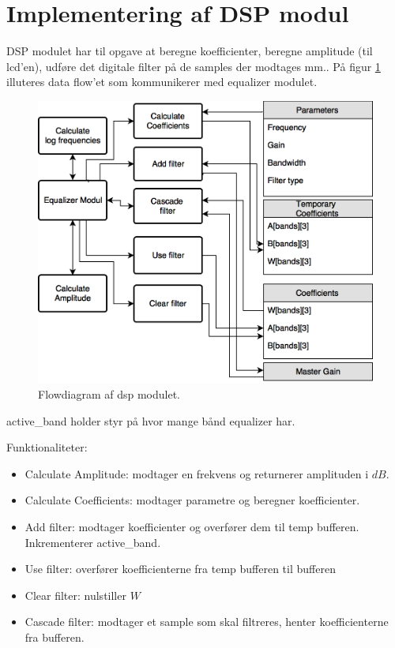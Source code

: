 \section{Implementering af DSP modul}\label{sec:implementering_dsp}
DSP modulet har til opgave at beregne koefficienter, beregne amplitude (til lcd'en), udføre det 
digitale filter på de samples der modtages mm.. På figur \ref{fig:dsp_flow_diag} illuteres data flow'et 
som kommunikerer med equalizer modulet.

\begin{figure}[h]
\centering
\includegraphics[scale = 0.3]{billeder/dsp_flowdiagram}
\caption{Flowdiagram af dsp modulet.}
\label{fig:dsp_flow_diag}
\end{figure}


active\_band holder styr på hvor mange bånd equalizer har.



Funktionaliteter:
\begin{itemize}[noitemsep,nolistsep]
\item Calculate Amplitude: modtager en frekvens og returnerer amplituden i $dB$.  \\
\item Calculate Coefficients: modtager parametre og beregner koefficienter. \\
\item Add filter: modtager koefficienter og overfører dem til temp bufferen. Inkrementerer active\_band.\\
\item Use filter: overfører koefficienterne fra temp bufferen til bufferen \\
\item Clear filter: nulstiller $W$  \\
\item Cascade filter: modtager et sample som skal filtreres, henter koefficienterne fra bufferen.
\end{itemize}
